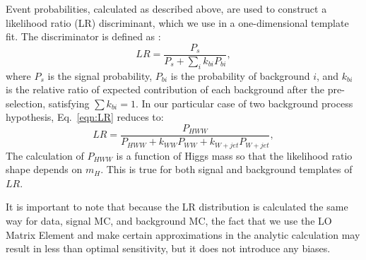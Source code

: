Event probabilities, calculated as described above, are used to construct 
a likelihood ratio (LR) discriminant, which we use in a one-dimensional template fit.  
The discriminator is defined as :
\begin{equation}
\label{eqn:LR}
LR = \frac { P_s} { P_s + \sum_i k_{bi} P_{bi}},
\end{equation}
where $P_s$ is the signal probability, $P_{bi}$ is the probability of background $i$, and 
 $k_{bi}$ is the relative ratio of expected contribution of each background after the pre-selection, satisfying $\sum k_{bi} =1$.
In our particular case of two background process hypothesis, Eq.~\ref{eqn:LR} reduces to:
\begin{equation}
\label{eqn:LRHWW}
LR = \frac { P_{HWW}} { P_{HWW} + k_{WW} P_{WW}+k_{W+jet} P_{W+jet}},
\end{equation}
The calculation of $P_{HWW}$ is a function of Higgs mass so that the likelihood ratio
shape depends on $m_H$. This is true for both signal and background templates of $LR$.

It is important to note that because the LR distribution is calculated the same way for data,
signal MC, and background MC, the fact that we use the LO Matrix Element and make certain 
approximations in the analytic calculation may result in less than optimal sensitivity, but
it does not introduce any biases.
